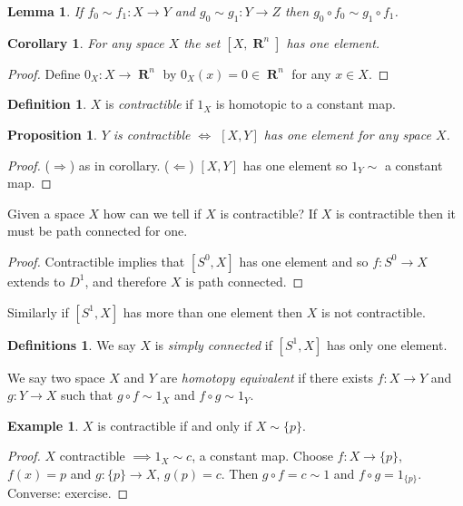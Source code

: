 \documentclass{article}
\newtheorem*{lem}{Lemma}
\newtheorem*{cor}{Corollary}
\newtheorem*{prop}{Proposition}
\theoremstyle{definition}
\newtheorem*{defn}{Definition}
\newtheorem*{defns}{Definitions}
\newtheorem*{ex}{Example}
\DeclareMathOperator{\RR}{\mathbf{R}}
\begin{document}
\begin{lem}
  If $f_0 \sim f_1\colon X \to Y$ and $g_0 \sim g_1\colon Y \to Z$ then 
  $g_0\circ f_0 \sim g_1\circ f_1$.
\end{lem}

\begin{cor}
  For any space $X$ the set $[X,\RR^n]$ has one element.
\end{cor}
\begin{proof}
  Define $0_X\colon X \to \RR^n$ by $0_X(x) = 0 \in \RR^n$ for any $x\in X$.
\end{proof}

\begin{defn}
  $X$ is \emph{contractible} if $1_X$ is homotopic to a constant map.
\end{defn}

\begin{prop}
  $Y$ is contractible $\iff$ $[X,Y]$ has one element for any space $X$.
\end{prop}

\begin{proof}
  ($\Rightarrow$) as in corollary.  ($\Leftarrow$) $[X,Y]$ has one element so 
  $1_Y \sim $ a constant map.
\end{proof}

Given a space $X$ how can we tell if $X$ is contractible? If $X$ is 
contractible then it must be path connected for one.

\begin{proof}
  Contractible implies that $[S^0, X]$ has one element and so $f \colon
  S^0 \to X$ extends to $D^1$, and therefore $X$ is path connected. %
\end{proof}

Similarly if $[S^1, X]$ has more than one element then $X$ is not
contractible.

\begin{defns}
  We say $X$ is \emph{simply connected} if $[S^1, X]$ has only one
  element.

  We say two space $X$ and $Y$ are \emph{homotopy equivalent} if there
  exists $f\colon X \to Y$ and $g\colon Y \to X$ such that $g\circ f
  \sim 1_X$ and $f\circ g \sim 1_Y$.
\end{defns}

\begin{ex}
  $X$ is contractible if and only if $X \sim \{p\}$.
\end{ex}
\begin{proof}
  $X$ contractible $\implies 1_X \sim c$, a constant map.
  Choose $f\colon X \to \{p\}$, $f(x) = p$ and $g\colon\{p\} \to X$,
  $g(p) = c$. Then $g\circ f = c \sim 1$ and $f\circ g = 1_{\{p\}}$.
  Converse: exercise.
\end{proof}
\end{document}
